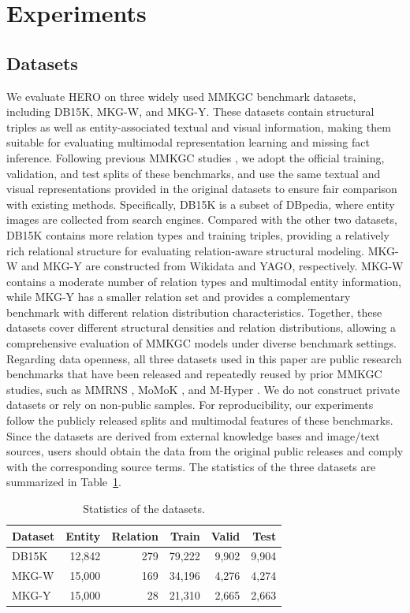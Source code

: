 \documentclass[a4paper,fleqn]{cas-sc}
\begin{document}
\section{Experiments}
\label{sec:experiments}
\subsection{Datasets}

We evaluate HERO on three widely used MMKGC benchmark datasets, including DB15K, MKG-W, and MKG-Y. These datasets contain structural triples as well as entity-associated textual and visual information, making them suitable for evaluating multimodal representation learning and missing fact inference. Following previous MMKGC studies \cite{li2023imf,zhang2025momok,liu2026mhyper}, we adopt the official training, validation, and test splits of these benchmarks, and use the same textual and visual representations provided in the original datasets to ensure fair comparison with existing methods.
Specifically, DB15K is a subset of DBpedia, where entity images are collected from search engines. Compared with the other two datasets, DB15K contains more relation types and training triples, providing a relatively rich relational structure for evaluating relation-aware structural modeling. MKG-W and MKG-Y are constructed from Wikidata and YAGO, respectively. MKG-W contains a moderate number of relation types and multimodal entity information, while MKG-Y has a smaller relation set and provides a complementary benchmark with different relation distribution characteristics. Together, these datasets cover different structural densities and relation distributions, allowing a comprehensive evaluation of MMKGC models under diverse benchmark settings.
Regarding data openness, all three datasets used in this paper are public research benchmarks that have been released and repeatedly reused by prior MMKGC studies, such as MMRNS \cite{xu2022rens}, MoMoK \cite{zhang2025momok}, and M-Hyper \cite{liu2026mhyper}. We do not construct private datasets or rely on non-public samples. For reproducibility, our experiments follow the publicly released splits and multimodal features of these benchmarks. Since the datasets are derived from external knowledge bases and image/text sources, users should obtain the data from the original public releases and comply with the corresponding source terms.
The statistics of the three datasets are summarized in Table~\ref{tab:datasets}. 

\begin{table}[t]
\centering
\caption{Statistics of the datasets.}
\label{tab:datasets}
\begin{tabular}{lrrrrr}
\toprule
\textbf{Dataset} & \textbf{Entity} & \textbf{Relation} & \textbf{Train} & \textbf{Valid} & \textbf{Test} \\
\midrule
DB15K & 12,842 & 279 & 79,222 & 9,902 & 9,904 \\
MKG-W & 15,000 & 169 & 34,196 & 4,276 & 4,274 \\
MKG-Y & 15,000 & 28 & 21,310 & 2,665 & 2,663 \\
\bottomrule
\end{tabular}
\end{table}
\end{document}

